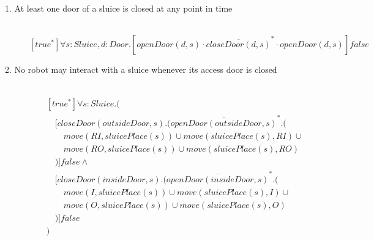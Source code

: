 
\newcommand{\tab}{\hspace{1em}}

\begin{description}
 \item[1. At least one door of a sluice is closed at any point in time]\mbox{}\\
\[
[true^*]\forall s:Sluice,d:Door.[openDoor(d, s) \cdot \overline{closeDoor(d, s)}^* \cdot openDoor(d, s)]false
\]


 \item[2. No robot may interact with a sluice whenever its access door is closed]\mbox{}\\
\begin{align*}
& [true^*]\forall s:Sluice.( \\
& \tab [closeDoor(outsideDoor, s).(\overline{openDoor(outsideDoor, s)}^*.( \\
& \tab\tab move(RI, sluicePlace(s)) \cup move(sluicePlace(s), RI) \cup \\
& \tab\tab move(RO, sluicePlace(s)) \cup move(sluicePlace(s), RO) \\
& \tab )]false \wedge \\
& \tab [closeDoor(insideDoor, s).(\overline{openDoor(insideDoor, s)}^*.( \\
& \tab\tab move(I, sluicePlace(s)) \cup move(sluicePlace(s), I) \cup \\
& \tab\tab move(O, sluicePlace(s)) \cup move(sluicePlace(s), O) \\
& \tab )]false \\
& )
\end{align*}
 
 \item[]
 

\end{description}
